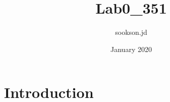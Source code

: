 \documentclass{article}
\title{Lab0_351}
\author{sookson.jd }
\date{January 2020}
\begin{document}
\maketitle

\section{Introduction}
\end{document}
